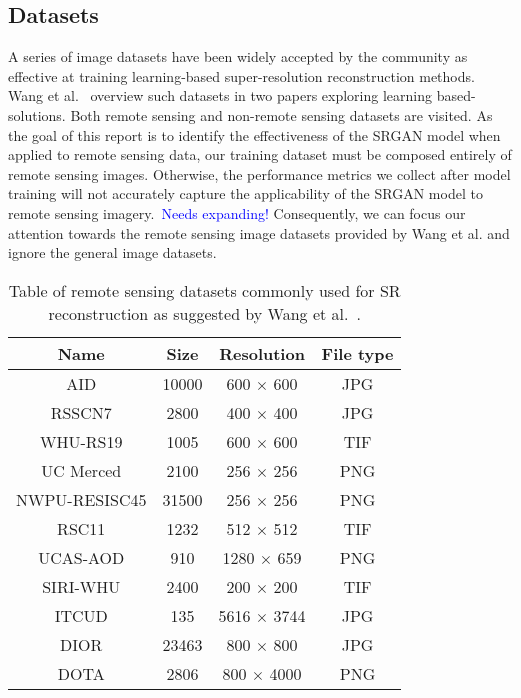 \subsection{Datasets}
A series of image datasets have been widely accepted by the community as effective at training learning-based super-resolution reconstruction methods. Wang et al.~\cite{remoteSensingDeepLearningReview, remoteSensingGANsReview} overview such datasets in two papers exploring learning based-solutions. Both remote sensing and non-remote sensing datasets are visited. As the goal of this report is to identify the effectiveness of the SRGAN model when applied to remote sensing data, our training dataset must be composed entirely of remote sensing images. Otherwise, the performance metrics we collect after model training will not accurately capture the applicability of the SRGAN model to remote sensing imagery.\ \textcolor{blue}{Needs expanding!} Consequently, we can focus our attention towards the remote sensing image datasets provided by Wang et al. and ignore the general image datasets.
\begin{table}
    \centering
    \begin{tabular}{|cccc|}
        \hline
        \textbf{Name} & \textbf{Size} & \textbf{Resolution} & \textbf{File type} \\
        \hline
        AID & 10000 & 600 $\times$ 600 & JPG \\
        RSSCN7 & 2800 & 400 $\times$ 400 & JPG \\
        WHU-RS19 & 1005 & 600 $\times$ 600 & TIF \\
        UC Merced & 2100 & 256 $\times$ 256 & PNG \\
        NWPU-RESISC45 & 31500 & 256 $\times$ 256 & PNG \\
        RSC11 & 1232 & 512 $\times$ 512 & TIF \\
        UCAS-AOD & 910 & 1280 $\times$ 659 & PNG \\
        SIRI-WHU & 2400 & 200 $\times$ 200 & TIF \\
        ITCUD & 135 & 5616 $\times$ 3744 & JPG \\
        DIOR & 23463 & 800 $\times$ 800 & JPG \\
        DOTA & 2806 & 800 $\times$ 4000 & PNG \\
        \hline
    \end{tabular}
    \caption{Table of remote sensing datasets commonly used for SR reconstruction as suggested by Wang et al.~\cite{remoteSensingDeepLearningReview,remoteSensingGANsReview}.}
    \label{table:datasets_table}
\end{table}


